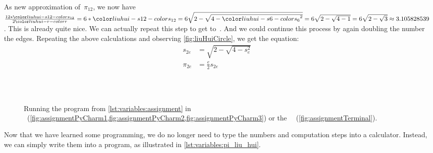 As new approximation of~$\pi_{12}$, we now have $\frac{12*\liuhuist}{2\liuhuir}=6*\liuhuist=6\sqrt{2-\sqrt{4-\liuhuiss^2}}=6\sqrt{2-\sqrt{4-1}}=6\sqrt{2-\sqrt{3}}\approx 3.105828539$.
This is already quite nice.
We can actually repeat this step to get to~\liuhuistf.
And we could continue this process by again doubling the number the edges.
Repeating the above calculations and observing \cref{fig:liuHuiCircle}, we get the equation:%
%
\begin{align}%
s_{2e} &= \sqrt{2-\sqrt{4-s_e^2}}\label{eq:liuhui:sidelength}\\%
\pi_{2e} &= \frac{e}{2} s_{2e}\label{eq:liuhui:approx}%
\end{align}%
%
%
%
\begin{figure}[tb]%
\centering%
%
%
\hfill%
%
%
\\%
%
%
\\%
%
%
%
\caption{Running the program  from \cref{lst:variables:assignment} in \pycharm~(\cref{fig:assignmentPyCharm1,fig:assignmentPyCharm2,fig:assignmentPyCharm3}) or the \ubuntu\ ~(\cref{fig:assignmentTerminal}).}%
\label{fig:variables:liuHuiPi}%
\end{figure}%
%
Now that we have learned some programming, we do no longer need to type the numbers and computation steps into a calculator.
Instead, we can simply write them into a program, as illustrated in \cref{lst:variables:pi_liu_hui}.
